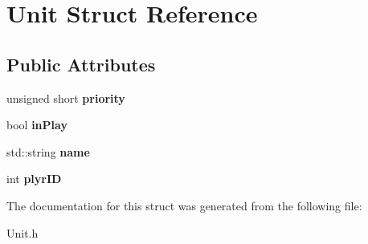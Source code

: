 \hypertarget{struct_unit}{}\section{Unit Struct Reference}
\label{struct_unit}
\subsection*{Public Attributes}
\begin{DoxyCompactItemize}
\item 
\mbox{\label{struct_unit_ab9bb48999c82f22f0b2a5fec8d967a0e}} 
unsigned short {\bfseries priority}
\item 
\mbox{\label{struct_unit_aa888ca5b97510472770a43afa276c556}} 
bool {\bfseries in\+Play}
\item 
\mbox{\label{struct_unit_a03a2344fa6977a2ce44b320e44bc9caa}} 
std\+::string {\bfseries name}
\item 
\mbox{\label{struct_unit_a33e6ca1b6ec957621ca1f64b2051f946}} 
int {\bfseries plyr\+ID}
\end{DoxyCompactItemize}


The documentation for this struct was generated from the following file\+:\begin{DoxyCompactItemize}
\item 
Unit.\+h\end{DoxyCompactItemize}

